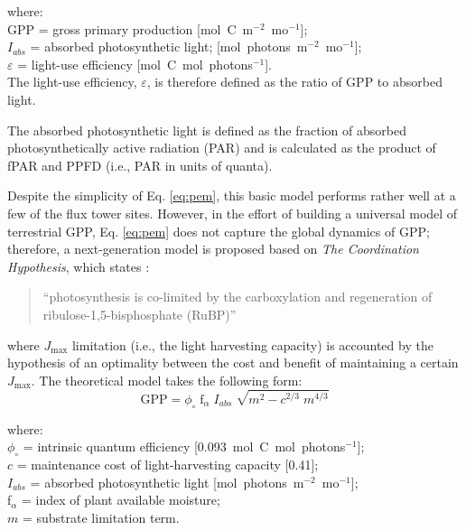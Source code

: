 \noindent where:\\
\indent GPP = gross primary production [mol~C~m$^{-2}$~mo$^{-1}$];\\
\indent $I_{abs}$ = absorbed photosynthetic light; [mol~photons~m$^{-2}$~mo$^{-1}$];\\
\indent $\varepsilon$ = light-use efficiency [mol~C~mol~photons$^{-1}$].\\

\noindent The light-use efficiency, $\varepsilon$, is therefore defined as the ratio of GPP to absorbed light. 

The absorbed photosynthetic light is defined as the fraction of absorbed photosynthetically active radiation (PAR) and is calculated as the product of fPAR and PPFD (i.e., PAR in units of quanta).

Despite the simplicity of Eq. \ref{eq:pem}, this basic model performs rather well at a few of the flux tower sites. 
However, in the effort of building a universal model of terrestrial GPP, Eq. \ref{eq:pem} does not capture the global dynamics of GPP; therefore, a next-generation model is proposed based on \emph{The Coordination Hypothesis}, which states \parencite{maire12}:
\begin{quote}
	``photosynthesis is co-limited by the carboxylation and regeneration of ribulose-1,5-bisphosphate (RuBP)''
\end{quote}
where $J_\text{max}$ limitation (i.e., the light harvesting capacity) is accounted by the hypothesis of an optimality between the cost and benefit of maintaining a certain $J_\text{max}$.
The theoretical model takes the following form:
\begin{equation}
\label{eq:nglue}
    \text{GPP} = \phi_{\circ}\; \text{f}_\alpha\; I_{abs}\; \sqrt{m^2 - c^{2/3}\; m^{4/3}}
\end{equation}

\noindent where:\\
\indent $\phi_{\circ}$ = intrinsic quantum efficiency [0.093~mol~C~mol~photons$^{-1}$];\\
\indent $c$ = maintenance cost of light-harvesting capacity [0.41];\\
\indent $I_{abs}$ = absorbed photosynthetic light [mol~photons~m$^{-2}$~mo$^{-1}$];\\
\indent f$_\alpha$ = index of plant available moisture;\\
\indent $m$ = substrate limitation term.\\

